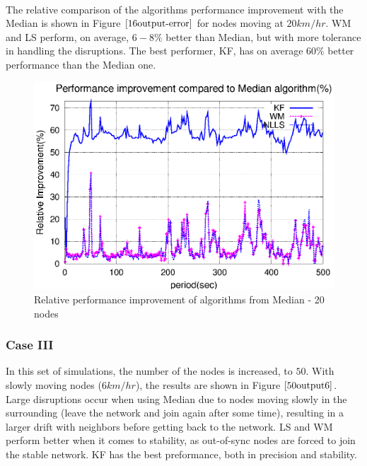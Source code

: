 \documentclass[a4paper,10pt]{report}
\begin{document}
\paragraph*{}
The relative comparison of the algorithms performance improvement
with the Median is shown in Figure $\ref{16output-error}$ for nodes
moving at $20km/hr$. WM and LS perform, on average, $6-8\%$ better
than Median, but with more tolerance in handling the disruptions.
The best performer, KF, has on average $60\%$ better performance
than the Median one.
\begin{figure}
\centering
\includegraphics[width= 0.7 \textwidth]{16output-error}
\caption{Relative performance improvement of algorithms from Median - 20 nodes} \label{16output-error}
\end{figure}
\subsubsection{\textbf{Case III}}
In this set of simulations, the number of the nodes is increased, to
$50$. With slowly moving nodes ($6km/hr$), the results are shown in
Figure $\ref{50output6}$. Large disruptions occur when using Median
due to nodes moving slowly in the surrounding (leave the network and
join again after some time), resulting in a larger drift with
neighbors before getting back to the network. LS and WM perform
better when it comes to stability, as out-of-sync nodes are forced
to join the stable network. KF has the best preformance, both in
precision and stability. 
\end{document}

